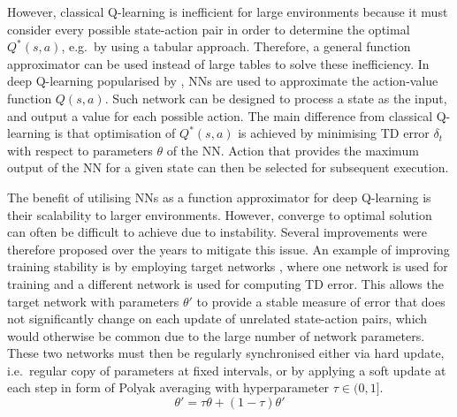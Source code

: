 However, classical Q-learning is inefficient for large environments because it must consider every possible state-action pair in order to determine the optimal \(Q^{*}(s, a)\), e.g.~by using a tabular approach. Therefore, a general function approximator can be used instead of large tables to solve these inefficiency. In deep Q-learning popularised by \citet{mnih_human-level_2015}, NNs are used to approximate the action-value function \(Q(s, a)\). Such network can be designed to process a state as the input, and output a value for each possible action. The main difference from classical Q-learning is that optimisation of \(Q^{*}(s, a)\) is achieved by minimising TD error \(\delta_{t}\) with respect to parameters \(\theta\) of the NN. Action that provides the maximum output of the NN for a given state can then be selected for subsequent execution.

The benefit of utilising NNs as a function approximator for deep Q-learning is their scalability to larger environments. However, converge to optimal solution can often be difficult to achieve due to instability. Several improvements were therefore proposed over the years to mitigate this issue. An example of improving training stability is by employing target networks \cite{mnih_human-level_2015}, where one network is used for training and a different network is used for computing TD error. This allows the target network with parameters \(\theta'\) to provide a stable measure of error that does not significantly change on each update of unrelated state-action pairs, which would otherwise be common due to the large number of network parameters. These two networks must then be regularly synchronised either via hard update, i.e.~regular copy of parameters at fixed intervals, or by applying a soft update at each step in form of Polyak averaging with hyperparameter \(\tau \in (0, 1]\).
\begin{equation}
    \theta' = \tau \theta + (1-\tau) \theta'
\end{equation}
